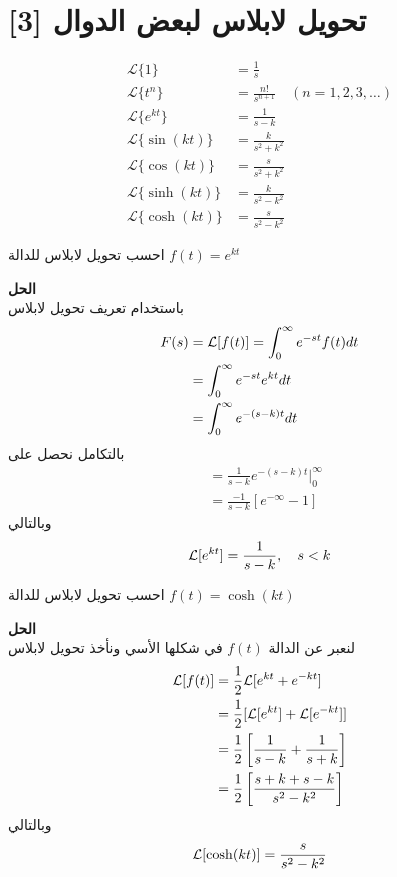 \section[تحويل لابلاس لبعض الدوال]{تحويل لابلاس لبعض الدوال [3]}
\begin{align}
	\mathcal{L}\{1\}         &= \frac{1}{s}      \\
	\mathcal{L}\{t^n\}       &= \frac{n!}{s^{n+1}}   \quad (n = 1, 2, 3, \dots) \\
	\mathcal{L}\{e^{kt}\}    &= \frac{1}{s-k}        \\
	\mathcal{L}\{\sin(kt)\}  &= \frac{k}{s^2+k^2} \\
	\mathcal{L}\{\cos(kt)\} &= \frac{s}{s^2+k^2}   \\
	\mathcal{L}\{\sinh(kt)\} &= \frac{k}{s^2-k^2}   \\
	\mathcal{L}\{\cosh(kt)\} &= \frac{s}{s^2-k^2}    \
\end{align}

\begin{example}
	احسب تحويل لابلاس للدالة $f(t) = e^{kt}$
\end{example}
\noindent
\textbf{الحل}\\
\noindent
باستخدام تعريف تحويل لابلاس
\begin{align*}
	F(s) &= \mathcal{L}[f(t)] = \int_{0}^{\infty} e^{-st} f(t) dt\\
	&= \int_{0}^{\infty} e^{-st} e^{kt} dt\\
	&= \int_{0}^{\infty} e^{-(s-k)t}dt
\end{align*}
بالتكامل نحصل على
\begin{align*}
	&= \frac{1}{s-k} e^{-(s-k)t}\Big|^\infty_0\\
	&= \frac{-1}{s-k} [e^{-\infty} -1]
\end{align*}
وبالتالي
\[
\mathcal{L}[e^{kt}] = \frac{1}{s-k}, \quad s < k
\]

\begin{example}
	احسب تحويل لابلاس للدالة $f(t) = \cosh(kt)$
\end{example}
\noindent
\textbf{الحل}\\
\noindent
لنعبر عن الدالة $f(t)$ في شكلها الأسي ونأخذ تحويل لابلاس
\begin{align*}
	\mathcal{L}[f(t)] &= \frac{1}{2}\mathcal{L}[e^{kt} + e^{-kt}]\\
	&= \frac{1}{2} [\mathcal{L}[e^{kt}] + \mathcal{L}[e^{-kt}]]\\
	&= \frac{1}{2} \left[\frac{1}{s-k} + \frac{1}{s+k}\right]\\
	&= \frac{1}{2}\left[\frac{s+k+s-k}{s^2-k^2}\right]
\end{align*}
وبالتالي
\[
\mathcal{L}[\cosh(kt)] = \frac{s}{s^2-k^2}
\]

